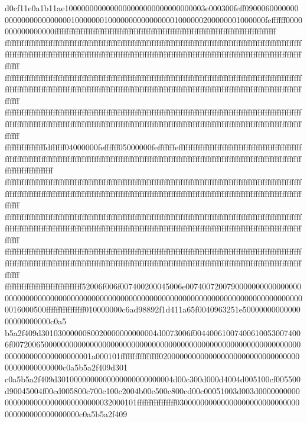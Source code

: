 d0cf11e0a1b11ae1000000000000000000000000000000003e000300feff0900060000000000000000000000010000000100000000000000001000000200000001000000feffffff0000000000000000ffffffffffffffffffffffffffffffffffffffffffffffffffffffffffffffffffffffffffffffffffffffffffff
ffffffffffffffffffffffffffffffffffffffffffffffffffffffffffffffffffffffffffffffffffffffffffffffffffffffffffffffffffffffffffffffffffffffffffffffffffffffffffffffffffffffffffffffffffffffffffffffffffffffffffffffffffffffffffffffffffffffffffffffffffffffffffff
ffffffffffffffffffffffffffffffffffffffffffffffffffffffffffffffffffffffffffffffffffffffffffffffffffffffffffffffffffffffffffffffffffffffffffffffffffffffffffffffffffffffffffffffffffffffffffffffffffffffffffffffffffffffffffffffffffffffffffffffffffffffffffff
ffffffffffffffffffffffffffffffffffffffffffffffffffffffffffffffffffffffffffffffffffffffffffffffffffffffffffffffffffffffffffffffffffffffffffffffffffffffffffffffffffffffffffffffffffffffffffffffffffffffffffffffffffffffffffffffffffffffffffffffffffffffffffff
fffffffffffffffffdffffff04000000feffffff05000000fefffffffeffffffffffffffffffffffffffffffffffffffffffffffffffffffffffffffffffffffffffffffffffffffffffffffffffffffffffffffffffffffffffffffffffffffffffffffffffffffffffffffffffffffffffffffffffffffffffffffffff
ffffffffffffffffffffffffffffffffffffffffffffffffffffffffffffffffffffffffffffffffffffffffffffffffffffffffffffffffffffffffffffffffffffffffffffffffffffffffffffffffffffffffffffffffffffffffffffffffffffffffffffffffffffffffffffffffffffffffffffffffffffffffffff
ffffffffffffffffffffffffffffffffffffffffffffffffffffffffffffffffffffffffffffffffffffffffffffffffffffffffffffffffffffffffffffffffffffffffffffffffffffffffffffffffffffffffffffffffffffffffffffffffffffffffffffffffffffffffffffffffffffffffffffffffffffffffffff
ffffffffffffffffffffffffffffffffffffffffffffffffffffffffffffffffffffffffffffffffffffffffffffffffffffffffffffffffffffffffffffffffffffffffffffffffffffffffffffffffffffffffffffffffffffffffffffffffffffffffffffffffffffffffffffffffffffffffffffffffffffffffffff
ffffffffffffffffffffffffffffffff52006f006f007400200045006e00740072007900000000000000000000000000000000000000000000000000000000000000000000000000000000000000000016000500ffffffffffffffff010000000c6ad98892f1d411a65f0040963251e5000000000000000000000000c0a5
b5a2f409d3010300000080020000000000004d0073006f004400610074006100530074006f0072006500000000000000000000000000000000000000000000000000000000000000000000000000000000001a000101ffffffffffffffff020000000000000000000000000000000000000000000000c0a5b5a2f409d301
c0a5b5a2f409d3010000000000000000000000004d00c300d000d4004d005100cf005500d90045004f00cd005800c700c100c2004b00c500c800cd00c00051003d003d000000000000000000000000000000000032000101ffffffffffffffff030000000000000000000000000000000000000000000000c0a5b5a2f409
